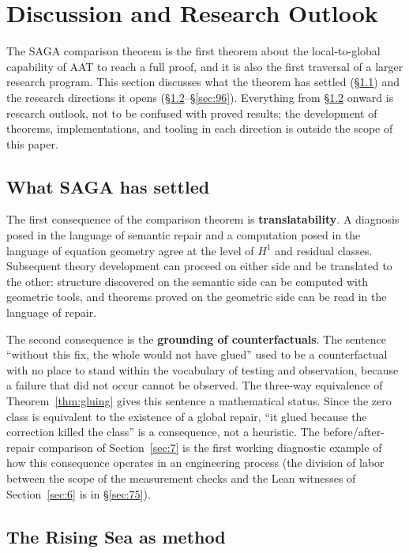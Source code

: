 \section{Discussion and Research Outlook}\label{sec:9}

The SAGA comparison theorem is the first theorem about the
local-to-global capability of AAT to reach a full proof, and it is
also the first traversal of a larger research program. This section
discusses what the theorem has settled (\S\ref{sec:91}) and the
research directions it opens (\S\ref{sec:92}--\S\ref{sec:96}).
Everything from \S\ref{sec:92} onward is research outlook, not to be
confused with proved results; the development of theorems,
implementations, and tooling in each direction is outside the scope of
this paper.

\subsection{What SAGA has settled}\label{sec:91}

The first consequence of the comparison theorem is
\textbf{translatability}. A diagnosis posed in the language of
semantic repair and a computation posed in the language of equation
geometry agree at the level of $H^1$ and residual classes. Subsequent
theory development can proceed on either side and be translated to the
other: structure discovered on the semantic side can be computed with
geometric tools, and theorems proved on the geometric side can be read
in the language of repair.

The second consequence is the \textbf{grounding of counterfactuals}.
The sentence ``without this fix, the whole would not have glued'' used
to be a counterfactual with no place to stand within the vocabulary of
testing and observation, because a failure that did not occur cannot
be observed. The three-way equivalence of Theorem~\ref{thm:gluing}
gives this sentence a mathematical status. Since the zero class is
equivalent to the existence of a global repair, ``it glued because the
correction killed the class'' is a consequence, not a heuristic. The
before/after-repair comparison of Section~\ref{sec:7} is the first
working diagnostic example of how this consequence operates in an
engineering process (the division of labor between the scope of the
measurement checks and the Lean witnesses of Section~\ref{sec:6} is in
\S\ref{sec:75}).

\subsection{The Rising Sea as method}\label{sec:92}

